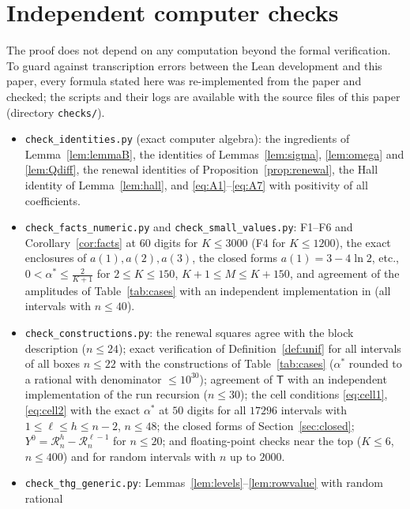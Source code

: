 \documentclass[11pt]{amsart}
\theoremstyle{definition}
\theoremstyle{remark}
\numberwithin{equation}{section}
\newcommand{\sT}{\mathsf{T}}
\newcommand{\cR}{\mathcal{R}}
\newcommand{\lean}[1]{\texttt{#1}}
\begin{document}
\section{Independent computer checks}\label{app:checks}

The proof does not depend on any computation beyond the formal verification. To guard against
transcription errors between the Lean development and this paper, every formula stated here was
re-implemented from the paper and checked; the scripts and their logs are available with the source
files of this paper (directory \lean{checks/}).
\begin{itemize}
\item \lean{check\_identities.py} (exact computer algebra): the ingredients of Lemma~\ref{lem:lemmaB},
the identities of Lemmas~\ref{lem:sigma}, \ref{lem:omega} and \ref{lem:Qdiff}, the renewal identities of
Proposition~\ref{prop:renewal}, the Hall identity of Lemma~\ref{lem:hall}, and
\eqref{eq:A1}--\eqref{eq:A7} with positivity of all coefficients.
\item \lean{check\_facts\_numeric.py} and \lean{check\_small\_values.py}: F1--F6 and
Corollary~\ref{cor:facts} at $60$ digits for $K\le3000$ (F4 for $K\le1200$), the exact enclosures of
$a(1),a(2),a(3)$, the closed forms $a(1)=3-4\ln2$, etc., $0<\alpha^*\le\frac2{K+1}$ for
$2\le K\le150$, $K+1\le M\le K+150$, and agreement of the amplitudes of Table~\ref{tab:cases} with an
independent implementation in \cite{STUrepo} (all intervals with $n\le40$).
\item \lean{check\_constructions.py}: the renewal squares agree with the block description ($n\le24$);
exact verification of Definition~\ref{def:unif} for all intervals of all boxes $n\le22$ with the
constructions of Table~\ref{tab:cases} ($\alpha^*$ rounded to a rational with denominator
$\le10^{30}$); agreement of $\sT$ with an independent implementation of the run recursion ($n\le30$); the
cell conditions \eqref{eq:cell1}, \eqref{eq:cell2} with the exact $\alpha^*$ at $50$ digits for all
$17296$ intervals with $1\le\ell\le h\le n-2$, $n\le48$; the closed forms of Section~\ref{sec:closed};
$Y^0=\cR^h_n-\cR^{\ell-1}_n$ for $n\le20$; and floating-point checks near the top ($K\le6$, $n\le400$)
and for random intervals with $n$ up to $2000$.
\item \lean{check\_thg\_generic.py}: Lemmas~\ref{lem:levels}--\ref{lem:rowvalue} with random rational

\end{itemize}
\end{document}
